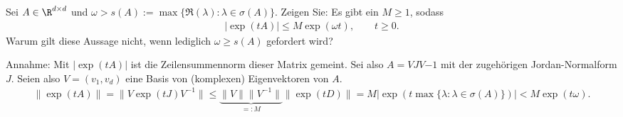 \begin{exercise}
Sei $A \in \R^{d \times d}$ und $\omega > s(A) := \max \{\Re(\lambda): \lambda \in \sigma(A)\}$.
Zeigen Sie: Es gibt ein $M \geq 1$, sodass
\begin{align*}
  |\exp(tA)| \leq M\exp(\omega t), \qquad t \geq 0.
\end{align*}
Warum gilt diese Aussage nicht, wenn lediglich $\omega \geq s(A)$ gefordert wird?
\end{exercise}
\begin{solution}
Annahme: Mit $|\exp(tA)|$ ist die Zeilensummennorm dieser Matrix gemeint.
Sei also $A = VJV{-1}$ mit der zugehörigen Jordan-Normalform $J$.
Seien also $V = (v_1,v_d)$ eine Basis von (komplexen) Eigenvektoren von $A$.
\begin{align*}
  \|\exp(tA)\| = \|V\exp(tJ)V^{-1}\| \leq \underbrace{\|V\|\|V^{-1}\|}_{=:M}\|\exp(tD)\|
  = M|\exp(t\max \{\lambda: \lambda \in \sigma(A)\})| < M\exp(t\omega).
\end{align*}

\end{solution}
